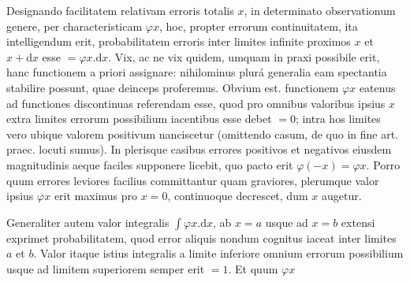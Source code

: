 Designando facilitatem relativam erroris totalis \(x\), in determinato observationum genere, per characteristicam \(\varphi x\), hoc, propter errorum continuitatem, ita intelligendum erit, probabilitatem erroris inter limites infinite proximos \(x\) et \(x+\mathrm{d}x\) esse \(=\varphi x.\mathrm{d}x\). Vix, ac ne vix quidem, umquam in praxi possibile erit, hanc functionem a priori assignare: nihilominus plurá generalia eam spectantia stabilire possunt, quae deinceps proferemus. Obvium est. functionem \(\varphi x\) eatenus ad functiones discontinuas referendam esse, quod pro omnibus valoribus ipsius \(x\) extra limites errorum possibilium iacentibus esse debet \(=0\); intra hos limites vero ubique valorem positivum nanciscetur (omittendo casum, de quo in fine art. praec. locuti sumus). In plerisque casibus errores positivos et negativos eiusdem magnitudinis aeque faciles supponere licebit, quo pacto erit \(\varphi(-x)=\varphi x\). Porro quum errores leviores facilius committantur quam graviores, plerumque valor ipsius \(\varphi x\) erit maximus pro \(x=0\), continuoque decrescet, dum \(x\) augetur.

Generaliter autem valor integralis \(\int\varphi x.\mathrm{d}x\), ab \(x=a\) usque ad \(x=b\) extensi exprimet probabilitatem, quod error aliquis nondum cognitus iaceat inter limites \(a\) et \(b\). Valor itaque istius integralis a limite inferiore omnium errorum possibilium usque ad limitem superiorem semper erit \(=1\). Et quum \(\varphi x\)
